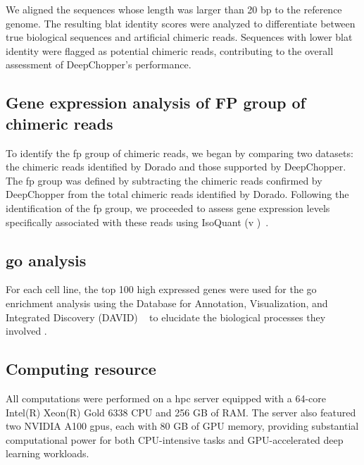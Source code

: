 \documentclass[pdflatex, sn-mathphys-num, lineno]{sn-jnl}%
\theoremstyle{thmstyleone}%
\theoremstyle{thmstyletwo}%
\theoremstyle{thmstylethree}%
\begin{document}
We aligned the sequences whose length was larger than 20 bp to the reference genome.
The resulting \gls{blat} identity scores were analyzed to differentiate between true biological sequences and artificial chimeric reads.
Sequences with lower \gls{blat} identity were flagged as potential chimeric reads, contributing to the overall assessment of DeepChopper's performance.


\subsection{Gene expression analysis of FP group of chimeric reads}

To identify the \gls{fp} group of chimeric reads, we began by comparing two datasets: the chimeric reads identified by Dorado and those supported by DeepChopper.
The \gls{fp} group was defined by subtracting the chimeric reads confirmed by DeepChopper from the total chimeric reads identified by Dorado.
Following the identification of the \gls{fp} group, we proceeded to assess gene expression levels specifically associated with these reads using IsoQuant (v )~\cite{prjibelski2023accurate}.


\subsection{\gls{go} analysis}

For each cell line, the top 100 high expressed genes were used for the \gls{go} enrichment analysis using the Database for Annotation, Visualization, and Integrated Discovery (DAVID) ~\cite{sherman2022david} to elucidate the biological processes they involved .

\subsection{Computing resource}

All computations were performed on a \gls{hpc} server equipped with a 64-core Intel(R) Xeon(R) Gold 6338 CPU and 256 GB of RAM.
The server also featured two NVIDIA A100 \glspl{gpu}, each with 80 GB of GPU memory, providing substantial computational power for both CPU-intensive tasks and GPU-accelerated deep learning workloads.



\end{document}
